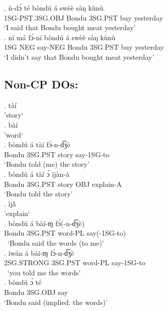 \documentclass{assets/fieldnotes}
\begin{document}
{\exg. ǹ-dɔ́ té bòndú á swèè sàŋ kùnù\\
1SG-PST.3SG.OBJ Bondu 3SG.PST buy yesterday\\
`I said that Bondu bought meat yesterday' \\

\exg. ní má fɔ̀-ní bòndú á swèè sàŋ kùnù\\
1SG NEG say-NEG Bondu 3SG.PST buy yesterday\\
`I didn't say that Bondu bought meat yesterday' \\



\subsection{Non-CP DOs:}

\exg. tàí\\
'story` \\

\exg. bàí\\
'word` \\

\exg. bòndú á tàí fɔ̀-n-d͡ʒè\\
Bondu 3SG.PST story say-1SG-to\\
`Bondu told (me) the story' \\

\exg. bòndú á tàí ɔ́ ìjàn-à\\
Bondu 3SG.PST story OBJ explain-A\\
`Bondu told the story' \\

\exg. ìjã̀\\
'explain` \\


\exg. bòndú á bàí-ɱ fɔ̀(-n-d͡ʒè)\\
Bondu 3SG.PST word-PL say(-1SG-to)\\\
`Bondu said the words (to me)' \\


\exg. íwán á bàí-ɱ fɔ̀-n-d͡ʒè\\
2SG.STRONG 3SG.PST word-PL say-1SG-to\\\
`you told me the words' \\


\exg. bòndú ɔ́ té\\
Bondu 3SG.OBJ say\\
`Bondu said (implied: the words)' \\

}
\end{document}
